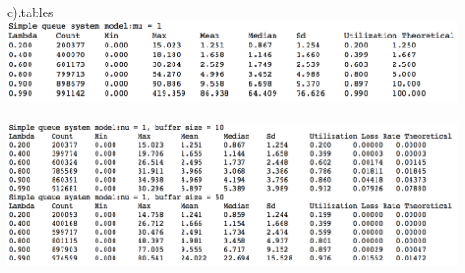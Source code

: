 \documentclass[paper=a4, fontsize=11pt]{scrartcl}
\numberwithin{equation}{section} %
\numberwithin{figure}{section} %
\numberwithin{table}{section} %
\begin{document}
       c).tables\\
        \includegraphics[scale=0.5]{b}\\\\
        \includegraphics[scale=0.5]{a}
    
\end{document}
